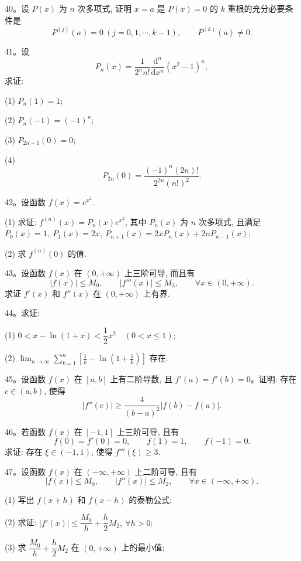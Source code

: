 40。设 $P(x)$ 为 $n$ 次多项式, 证明 $x=a$ 是 $P(x)=0$ 的 $k$ 重根的充分必要条件是
\[
  P^{(j)}(a)=0\ (j=0,1,\cdots,k-1),\qquad P^{(k)}(a)\ne0.
\]

41。设
\[
  P_n(x)=\frac1{2^n n!}\frac{\mathrm d^n}{\mathrm dx^n}(x^2-1)^n,
\]
求证:

(1) $P_n(1)=1$;

(2) $P_n(-1)=(-1)^n$;

(3) $P_{2n-1}(0)=0$;

(4)
\[
  P_{2n}(0)=\frac{(-1)^n(2n)!}{2^{2n}(n!)^2}.
\]

42。设函数 $f(x)=e^{x^2}$.

(1) 求证: $f^{(n)}(x)=P_n(x)e^{x^2}$, 其中 $P_n(x)$ 为 $n$ 次多项式, 且满足 $P_0(x)=1,\ P_1(x)=2x,\ P_{n+1}(x)=2xP_n(x)+2nP_{n-1}(x)$;

(2) 求 $f^{(n)}(0)$ 的值.

43。设函数 $f(x)$ 在 $(0,+\infty)$ 上三阶可导, 而且有
\[
  |f(x)|\leqslant M_0,\qquad |f'''(x)|\leqslant M_3,\qquad \forall x\in(0,+\infty).
\]
求证 $f'(x)$ 和 $f''(x)$ 在 $(0,+\infty)$ 上有界.

44。求证:

(1) $0<x-\ln(1+x)<\dfrac12x^2\quad (0<x\leqslant1)$;

(2) $\displaystyle\lim_{n\to\infty}\sum_{k=1}^n\left[\frac1k-\ln\left(1+\frac1k\right)\right]$ 存在.

45。设函数 $f(x)$ 在 $[a,b]$ 上有二阶导数, 且 $f'(a)=f'(b)=0$。证明: 存在 $c\in(a,b)$, 使得
\[
  |f''(c)|\geqslant\frac4{(b-a)^2}|f(b)-f(a)|.
\]

46。若函数 $f(x)$ 在 $[-1,1]$ 上三阶可导, 且有
\[
  f(0)=f'(0)=0,\qquad f(1)=1,\qquad f(-1)=0.
\]
求证: 存在 $\xi\in(-1,1)$, 使得 $f'''(\xi)\geqslant3$.

47。设函数 $f(x)$ 在 $(-\infty,+\infty)$ 上二阶可导, 且有
\[
  |f(x)|\leqslant M_0,\qquad |f''(x)|\leqslant M_2,\qquad \forall x\in(-\infty,+\infty).
\]

(1) 写出 $f(x+h)$ 和 $f(x-h)$ 的泰勒公式;

(2) 求证: $|f'(x)|\leqslant\dfrac{M_0}h+\dfrac h2M_2,\ \forall h>0$;

(3) 求 $\dfrac{M_0}h+\dfrac h2M_2$ 在 $(0,+\infty)$ 上的最小值;

